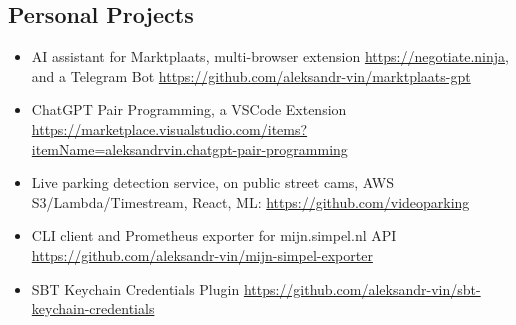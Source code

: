 \subsection*{Personal Projects}
\begin{itemize}[noitemsep, nosep]
  \item AI assistant for Marktplaats, multi-browser extension \href{https://negotiate.ninja}{\url{https://negotiate.ninja}}, and a Telegram Bot
  \href{https://github.com/aleksandr-vin/marktplaats-gpt}{\url{https://github.com/aleksandr-vin/marktplaats-gpt}}
  \item ChatGPT Pair Programming, a VSCode Extension
  \href{https://marketplace.visualstudio.com/items?itemName=aleksandrvin.chatgpt-pair-programming}{\url{https://marketplace.visualstudio.com/items?itemName=aleksandrvin.chatgpt-pair-programming}}
  \item Live parking detection service, on public street cams, AWS S3/Lambda/Timestream, React, ML: \href{https://github.com/videoparking}{\url{https://github.com/videoparking}}
  \item CLI client and Prometheus exporter for mijn.simpel.nl API
  \href{https://github.com/aleksandr-vin/mijn-simpel-exporter}{\url{https://github.com/aleksandr-vin/mijn-simpel-exporter}}
  \item SBT Keychain Credentials Plugin
  \href{https://github.com/aleksandr-vin/sbt-keychain-credentials}{\url{https://github.com/aleksandr-vin/sbt-keychain-credentials}}
\end{itemize}
